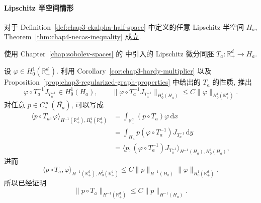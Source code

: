 \paragraph{Lipschitz 半空间情形}
\label{subsec:chap4-necas-lipschitz-half-space}

\begin{Proposition}
\label{prop:chap4-necas-lipschitz-half-space}
对于 Definition~\ref{def:chap3-ckalpha-half-space} 中定义的任意 Lipschitz 半空间 $H_a$, Theorem~\ref{thm:chap4-necas-inequality} 成立.
\end{Proposition}

\begin{Proof}
使用 Chapter~\ref{chap:sobolev-spaces} 的  中引入的 Lipschitz 微分同胚 $T_a:\mathbb R_+^d\to H_a$.

设 $\varphi\in H_0^1(\mathbb R_+^d)$. 利用 Corollary~\ref{cor:chap3-hardy-multiplier} 以及 Proposition~\ref{prop:chap3-regularized-graph-properties} 中给出的 $T_a$ 的性质, 推出
\[
 \varphi\circ T_a^{-1}J_{T_a^{-1}}\in H_0^1(H_a),
 \qquad
 \|\varphi\circ T_a^{-1}J_{T_a^{-1}}\|_{H_0^1(H_a)}
 \leq C\|\varphi\|_{H_0^1(\mathbb R_+^d)}.
\]
对任意 $p\in C_c^\infty(\overline{H_a})$, 可以写成
\[
\begin{aligned}
 \langle p\circ T_a,\varphi\rangle_{H^{-1}(\mathbb R_+^d),H_0^1(\mathbb R_+^d)}
 &=\int_{\mathbb R_+^d}(p\circ T_a)\varphi\,\mathrm dx\\
 &=\int_{H_a}p(\varphi\circ T_a^{-1})J_{T_a^{-1}}\,\mathrm dy\\
 &=\langle p,(\varphi\circ T_a^{-1})J_{T_a^{-1}}\rangle_{H^{-1}(H_a),H_0^1(H_a)},
\end{aligned}
\]
进而
\[
 \langle p\circ T_a,\varphi\rangle_{H^{-1}(\mathbb R_+^d),H_0^1(\mathbb R_+^d)}
 \leq C\|p\|_{H^{-1}(H_a)}\|\varphi\|_{H_0^1(\mathbb R_+^d)}.
\]
所以已经证明
\begin{equation}
 \|p\circ T_a\|_{H^{-1}(\mathbb R_+^d)}
 \leq C\|p\|_{H^{-1}(H_a)}.
 \label{eq:chap4-lipschitz-half-space-hminusone}
\end{equation}


\end{Proof}
